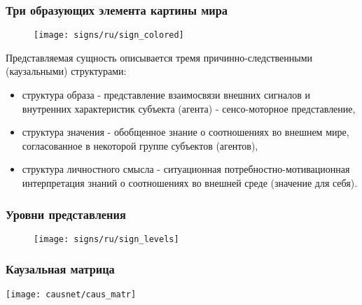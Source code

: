 \documentclass[default]{beamer}
\begin{document}
	\begin{frame}
		\frametitle{Три образующих элемента картины мира}
		\footnotesize
		\begin{figure}
			\texttt{[image: signs/ru/sign\_colored]}
		\end{figure}
		\vspace{-10pt}
		Представляемая сущность описывается тремя причинно-следственными (каузальными) структурами:
		\begin{itemize}
			\item {\color{red}структура образа} - представление взаимосвязи внешних сигналов и внутренних характеристик субъекта (агента) - сенсо-моторное представление,
			\item {\color{blue}структура значения} - обобщенное знание о соотношениях во внешнем мире, согласованное в некоторой группе субъектов (агентов),
			\item {\color{green!60!black}структура личностного смысла} - ситуационная потребностно-мотивационная интерпретация знаний о соотношениях во внешней среде (значение для себя).
		\end{itemize}
	\end{frame}
		
	\begin{frame}
		\frametitle{Уровни представления}
		\begin{figure}
		\texttt{[image: signs/ru/sign\_levels]}
		\end{figure}
	\end{frame}

	\begin{frame}
		\frametitle{Каузальная матрица}                             
		\centering
		\texttt{[image: causnet/caus\_matr]}
	\end{frame}
\end{document}
